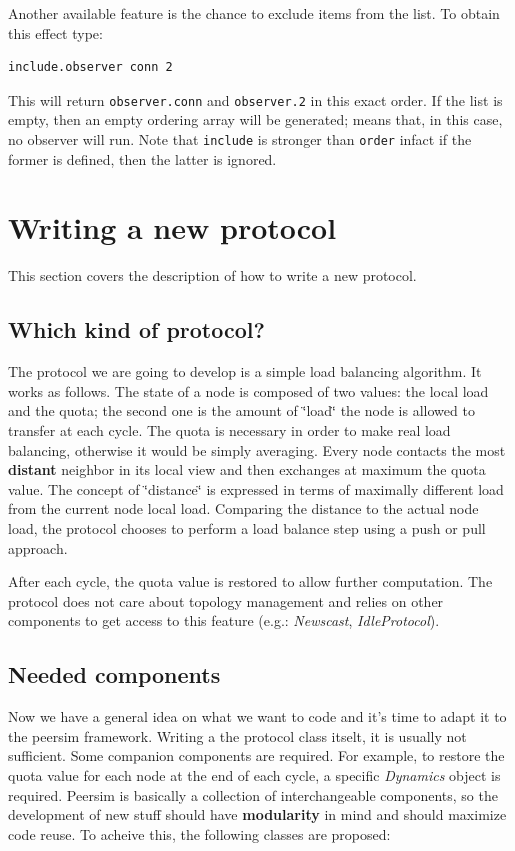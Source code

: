 \documentclass[a4paper,12pt]{article}
\begin{document}
Another available feature is the chance to exclude items from the
list. To obtain this effect type:

\begin{verbatim}
include.observer conn 2
\end{verbatim}

This will return \texttt{observer.conn} and \texttt{observer.2} in this 
exact order. If the list is empty, then an empty ordering array will be
generated; means that, in this case, no observer will run. Note that 
\texttt{include} is stronger than \texttt{order}
infact if the former is defined, then the latter is ignored.
 

\section{Writing a new protocol}

This section covers the description of how to write a new protocol. 


\subsection{Which kind of protocol?}

The protocol we are going to develop is a simple load balancing algorithm.
It works as follows. The state of a node is composed of two values:
the local load and the quota; the second one is the amount of \char`\"{}load\char`\"{}
the node is allowed to transfer at each cycle. The quota is necessary
in order to make real load balancing, otherwise it would be simply
averaging. Every node contacts the most \textbf{distant} neighbor
in its local view and then exchanges at maximum the quota value. The
concept of \char`\"{}distance\char`\"{} is expressed in terms of maximally
different load from the current node local load. Comparing the distance
to the actual node load, the protocol chooses to perform a load balance
step using a push or pull approach.

After each cycle, the quota value is restored to allow further computation.
The protocol does not care about topology management and relies on
other components to get access to this feature (e.g.: \emph{Newscast},
\emph{IdleProtocol}). 


\subsection{Needed components}

Now we have a general idea on what we want to code and it's time to
adapt it to the peersim framework. Writing a the protocol class itselt,
it is usually not sufficient. Some companion components are required.
For example, to restore the quota value for each node at the end of
each cycle, a specific \emph{Dynamics} object is required. Peersim
is basically a collection of interchangeable components, so the development
of new stuff should have \textbf{modularity} in mind and should maximize
code reuse. To acheive this, the following classes are proposed:
\end{document}
